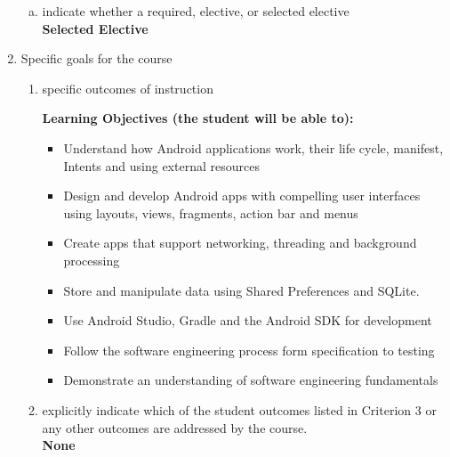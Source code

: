 \begin{enumerate}[1.]
\begin{enumerate}[a.]
\item indicate whether a required, elective, or selected elective\\ %
  {\bfseries
    Selected Elective
  }

\end{enumerate}

\item Specific goals for the course
\begin{enumerate}
\item specific outcomes of instruction\\ %
  {\bfseries
    Learning Objectives (the student will be able to):
    \begin{itemize}
      \item Understand how Android applications work, their life cycle, manifest, Intents and using external
resources
      \item Design and develop Android apps with compelling user interfaces using layouts, views,
fragments, action bar and menus
      \item Create apps that support networking, threading and background processing
      \item Store and manipulate data using Shared Preferences and SQLite.
      \item Use Android Studio, Gradle and the Android SDK for development
      \item Follow the software engineering process form specification to testing
      \item Demonstrate an understanding of software engineering fundamentals
    \end{itemize}
  }

\item explicitly indicate which of the student outcomes listed in Criterion 3 or any other outcomes are addressed by the course.\\
  {\bfseries
    None
  }
\end{enumerate}


\end{enumerate}

